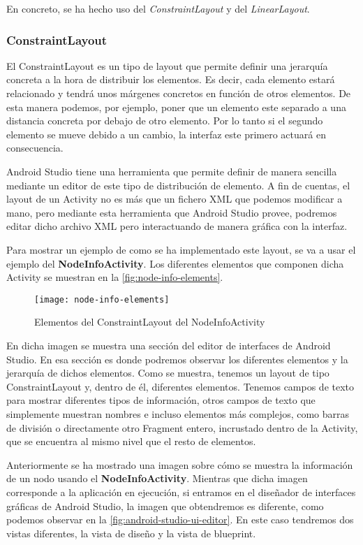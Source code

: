 En concreto, se ha hecho uso del \textit{ConstraintLayout} y del \textit{LinearLayout}.

\subsubsection{ConstraintLayout}

El ConstraintLayout es un tipo de layout que permite definir una jerarquía concreta a la hora de distribuir los elementos. Es decir, cada elemento estará relacionado y tendrá unos márgenes concretos en función de otros elementos. De esta manera podemos, por ejemplo, poner que un elemento este separado a una distancia concreta por debajo de otro elemento. Por lo tanto si el segundo elemento se mueve debido a un cambio, la interfaz este primero actuará en consecuencia.

Android Studio tiene una herramienta que permite definir de manera sencilla mediante un editor de este tipo de distribución de elemento. A fin de cuentas, el layout de un Activity no es más que un fichero XML que podemos modificar a mano, pero mediante esta herramienta que Android Studio provee, podremos editar dicho archivo XML pero interactuando de manera gráfica con la interfaz.

Para mostrar un ejemplo de como se ha implementado este layout, se va a usar el ejemplo del \textbf{NodeInfoActivity}. Los diferentes elementos que componen dicha Activity se muestran en la \autoref{fig:node-info-elements}.

\begin{figure}[H]
	\centering
	\texttt{[image: node-info-elements]}
	\caption{Elementos del ConstraintLayout del NodeInfoActivity}
	\label{fig:node-info-elements}
\end{figure}

En dicha imagen se muestra una sección del editor de interfaces de Android Studio. En esa sección es donde podremos observar los diferentes elementos y la jerarquía de dichos elementos. Como se muestra, tenemos un layout de tipo ConstraintLayout y, dentro de él, diferentes elementos. Tenemos campos de texto para mostrar diferentes tipos de información, otros campos de texto que simplemente muestran nombres e incluso elementos más complejos, como barras de división o directamente otro Fragment entero, incrustado dentro de la Activity, que se encuentra al mismo nivel que el resto de elementos.

Anteriormente se ha mostrado una imagen sobre cómo se muestra la información de un nodo usando el \textbf{NodeInfoActivity}. Mientras que dicha imagen corresponde a la aplicación en ejecución, si entramos en el diseñador de interfaces gráficas de Android Studio, la imagen que obtendremos es diferente, como podemos observar en la \autoref{fig:android-studio-ui-editor}. En este caso tendremos dos vistas diferentes, la vista de diseño y la vista de blueprint. 

